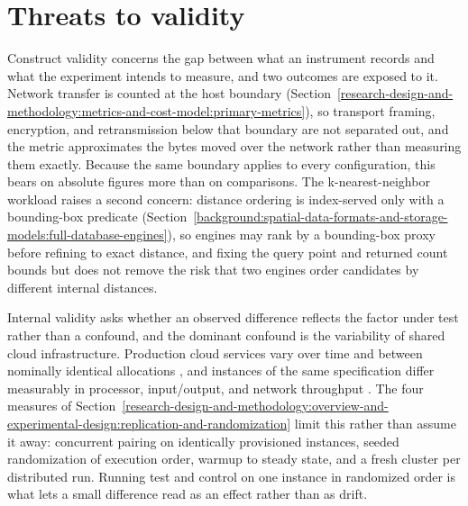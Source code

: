 \section{Threats to validity}
\label{research-design-and-methodology:threats-to-validity}

Construct validity concerns the gap between what an instrument records and what the experiment intends to measure, and two outcomes are exposed to it. Network transfer is counted at the host boundary (Section~\ref{research-design-and-methodology:metrics-and-cost-model:primary-metrics}), so transport framing, encryption, and retransmission below that boundary are not separated out, and the metric approximates the bytes moved over the network rather than measuring them exactly. Because the same boundary applies to every configuration, this bears on absolute figures more than on comparisons. The k-nearest-neighbor workload raises a second concern: distance ordering is index-served only with a bounding-box predicate (Section~\ref{background:spatial-data-formats-and-storage-models:full-database-engines}), so engines may rank by a bounding-box proxy before refining to exact distance, and fixing the query point and returned count bounds but does not remove the risk that two engines order candidates by different internal distances.

Internal validity asks whether an observed difference reflects the factor under test rather than a confound, and the dominant confound is the variability of shared cloud infrastructure. Production cloud services vary over time and between nominally identical allocations \parencite{iosup2011_performance_variability_cloud_services}, and instances of the same specification differ measurably in processor, input/output, and network throughput \parencite{schad2010_runtime_measurements_cloud}. The four measures of Section~\ref{research-design-and-methodology:overview-and-experimental-design:replication-and-randomization} limit this rather than assume it away: concurrent pairing on identically provisioned instances, seeded randomization of execution order, warmup to steady state, and a fresh cluster per distributed run. Running test and control on one instance in randomized order is what lets a small difference read as an effect rather than as drift.

